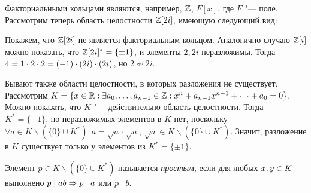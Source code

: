 \begin{example}
	Факториальными кольцами являются, например, $\mathbb{Z}$, $F[x]$, где $F$ "--- поле. Рассмотрим теперь область целостности $\mathbb{Z}[2i]$, имеющую следующий вид:
	\begin{center}
	\end{center}
	
	Покажем, что $\mathbb{Z}[2i]$ не является факториальным кольцом. Аналогично случаю $\mathbb{Z}[i]$ можно показать, что $\mathbb{Z}[2i]^* = \{\pm1\}$, и элементы $2, 2i$ неразложимы. Тогда $4 = 1 \cdot 2 \cdot 2 \hm= (-1)\cdot (2i) \cdot (2i)$, но $2 \not\sim 2i$.
\end{example}

\begin{note}
	Бывают также области целостности, в которых разложения не существует. Рассмотрим $K = \{x \in \mathbb{R}: \exists a_0, \dotsc, a_{n - 1} \in \mathbb{Z}: x^n + a_{n-1}x^{n-1} + \dotsb + a_0 = 0\}$. Можно показать, что $K$ "--- действительно область целостности. Тогда $K^* = \{\pm1\}$, но неразложимых элементов в $K$ нет, поскольку $\forall a \in K \backslash (\{0\} \cup K^*): a = \sqrt{a} \cdot \sqrt{a}$, $\sqrt{a} \in K \backslash (\{0\} \cup K^*)$. Значит, разложение в $K$ существует только у элементов из $K^* = \{\pm1\}$.
\end{note}

\begin{definition}
	Элемент $p \in K \backslash (\{0\} \cup K^*)$ называется \textit{простым}, если для любых $x, y \hm\in K$ выполнено $p \mid ab \Rightarrow p \mid a$ или $p \mid b$.
\end{definition}

